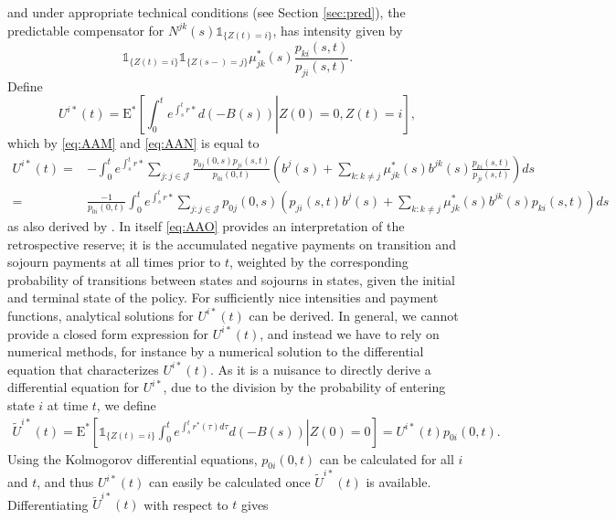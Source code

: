 \documentclass[12pt]{article}
\newcommand{\E}{\text{E}}
\newcommand{\indic}[1]{\mathds{1}_{ \{ #1 \} }}
\theoremstyle{my_thm}
\begin{document}
and under appropriate technical conditions (see Section \ref{sec:pred}), the predictable compensator for $N^{jk}(s)\indic{Z(t)=i}$, has intensity given by
\begin{equation}
\indic{Z(t)=i}\indic{Z(s-)=j}\mu^*_{jk}(s)\frac{p_{ki}(s,t)}{p_{ji}(s,t)}. \label{eq:AAN}
\end{equation}
Define
$$
U^{i*}(t)= \E^*  \left[ \left. \int_0^t e^{\int_s^t r*} d(-B(s)) \right| Z(0)=0, Z(t)=i \right],
$$
which by \eqref{eq:AAM} and \eqref{eq:AAN} is equal to
\begin{align}
U^{i*}(t)=& -\int_0^t e^{\int_s^t r*} \sum_{j:j \in \mathcal{J}} \frac{p_{0j}(0,s)p_{ji}(s,t)}{p_{0i}(0,t)} \left(  b^{j}(s) + \sum_{k:k \neq j}  \mu^*_{jk}(s) b^{jk}(s)\frac{p_{ki}(s,t)}{p_{ji}(s,t)} \right) ds
 \nonumber \\
=&
 \frac{-1}{p_{0i}(0,t)}\int_0^t e^{\int_s^t r*} \sum_{j:j \in \mathcal{J}} p_{0j}(0,s) \left(p_{ji}(s,t)   b^{j}(s) + \sum_{k:k \neq j}  \mu^*_{jk}(s) b^{jk}(s) p_{ki}(s,t) \right) ds \label{eq:AAO}
\end{align}
as also derived by \citet{Norberg}. In itself \eqref{eq:AAO} provides an interpretation of the retrospective reserve; it is the accumulated negative payments on transition and sojourn payments at all times prior to $t$, weighted by the corresponding probability of transitions between states and sojourns in states, given the initial and terminal state of the policy. For sufficiently nice intensities and payment functions, analytical solutions for $U^{i*}(t)$ can be derived. In general, we cannot provide a closed form expression for $U^{i*}(t)$, and instead we have to rely on numerical methods, for instance by a numerical solution to the differential equation that characterizes $U^{i*}(t)$. As it is a nuisance to directly derive a differential equation for $U^{i*}$, due to the division by the probability of entering state $i$ at time $t$, we define
\begin{align*}
\tilde{U}^{i*}(t)= \E^* \left. \left[ \indic{Z(t)=i} \int_0^t e^{\int_s^t r^*(\tau) d\tau} d(-B(s)) \right| Z(0)=0\right] = U^{i*}(t)p_{0i}(0,t).
\end{align*}
Using the Kolmogorov differential equations, $p_{0i}(0,t)$ can be calculated for all $i$ and $t$, and thus $U^{i*}(t)$ can easily be calculated once $\tilde{U}^{i*}(t)$ is available. Differentiating $\tilde{U}^{i*}(t)$ with respect to $t$ gives
\end{document}
